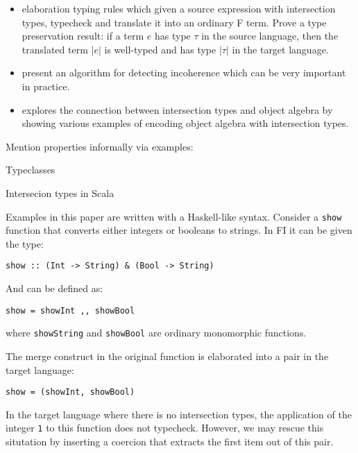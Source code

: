 \documentclass[preprint]{sigplanconf}
\begin{document}
\begin{itemize}

\item{elaboration typing rules which given a source expression with intersection
    types, typecheck and translate it into an ordinary F term. Prove a type
    preservation result: if a term $e$ has type $\tau$ in the source language,
    then the translated term $|e|$ is well-typed and has type $|\tau|$ in the
    target language.}

\item{present an algorithm for detecting incoherence which can be very important
    in practice.}

\item{explores the connection between intersection types and object algebra by
    showing various examples of encoding object algebra with intersection
    types.}

\end{itemize}


Mention properties informally via examples:


Typeclasses

Intersecion types in Scala


Examples in this paper are written with a Haskell-like syntax. Consider a
\texttt{show} function that converts either integers or booleans to strings. In
FI it can be given the type:

\begin{verbatim}
show :: (Int -> String) & (Bool -> String)
\end{verbatim}

And can be defined as:

\begin{verbatim}
show = showInt ,, showBool
\end{verbatim}

where \texttt{showString} and \texttt{showBool} are ordinary monomorphic
functions.

The merge construct in the original function is elaborated into a pair in the
target language:

\begin{verbatim}
show = (showInt, showBool)
\end{verbatim}

In the target language where there is no intersection types, the application of
the integer \texttt{1} to this function does not typecheck. However, we may
rescue this situtation by inserting a coercion that extracts the first item out
of this pair.
\end{document}

